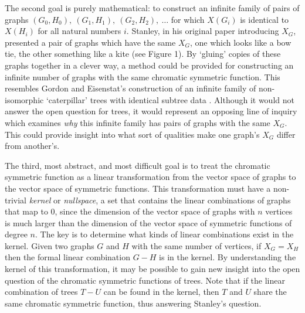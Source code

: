 \documentclass[a4paper,12pt]{article}
\begin{document}
\begin{spacing}{1}
The second goal is purely mathematical: to construct an infinite family of pairs of graphs $(G_0, H_0),\ (G_1, H_1),\ (G_2, H_2),\ \ldots$ for which $X(G_i)$ is identical to $X(H_i)$ for all natural numbers $i$. Stanley, in his original paper introducing $X_G$, presented a pair of graphs which have the same $X_G$, one which looks like a bow tie, the other something like a kite (see Figure 1). By `gluing' copies of these graphs together in a clever way, a method could be provided for constructing an infinite number of graphs with the same chromatic symmetric function. This resembles Gordon and Eisenstat's construction of an infinite family of non-isomorphic `caterpillar' trees with identical subtree data \cite{caterpillarfamily}. Although it would not answer the open question for trees, it would represent an opposing line of inquiry which examines \emph{why} this infinite family has pairs of graphs with the same $X_G$. This could provide insight into what sort of qualities make one graph's $X_G$ differ from another's.

The third, most abstract, and most difficult goal is to treat the chromatic symmetric function as a linear transformation from the vector space of graphs to the vector space of symmetric functions. This transformation must have a non-trivial \emph{kernel} or \emph{nullspace}, a set that contains the linear combinations of graphs that map to 0, since the dimension of the vector space of graphs with $n$ vertices is much larger than the dimension of the vector space of symmetric functions of degree $n$. The key is to determine what kinds of linear combinations exist in the kernel. Given two graphs $G$ and $H$ with the same number of vertices, if $X_G = X_H$ then the formal linear combination $G - H$ is in the kernel. By understanding the kernel of this transformation, it may be possible to gain new insight into the open question of the chromatic symmetric functions of trees. Note that if the linear combination of trees $T-U$ can be found in the kernel, then $T$ and $U$ share the same chromatic symmetric function, thus answering Stanley's question.


\end{spacing}
\end{document}
